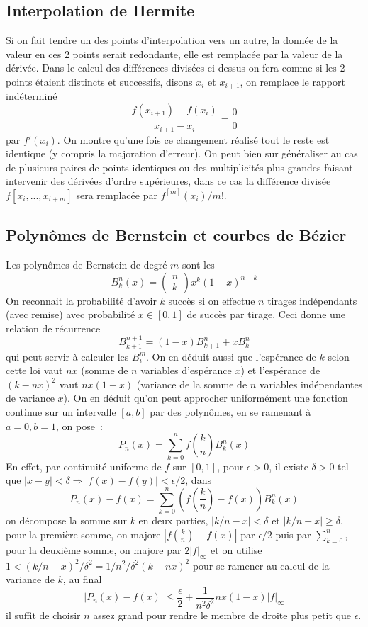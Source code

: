 \documentclass[a4paper,11pt]{article}
\begin{document}
\subsection{Interpolation de Hermite}
Si on fait tendre un des points d'interpolation vers un autre, la
donn\'ee de la valeur en ces 2 points serait redondante, elle 
est remplac\'ee par la valeur de la d\'eriv\'ee. Dans le calcul
des diff\'erences divis\'ees ci-dessus on fera comme si les
2 points \'etaient distincts et successifs, disons $x_i$ et $x_{i+1}$,
on remplace le rapport ind\'etermin\'e 
\[ \frac{f(x_{i+1})-f(x_i)}{x_{i+1}-x_i} = \frac00\]
par $f'(x_i)$.
On montre qu'une fois ce changement r\'ealis\'e
tout le reste est identique (y compris la majoration d'erreur).
On peut bien sur g\'en\'eraliser au cas de plusieurs paires de points 
identiques ou des multiplicit\'es plus grandes faisant intervenir
des d\'eriv\'ees d'ordre sup\'erieures, dans ce cas la diff\'erence
divis\'ee $f[x_i,...,x_{i+m}]$ sera remplac\'ee par $f^{[m]}(x_i)/m!$.

\subsection{Polyn\^omes de Bernstein et courbes de
  B\'ezier} 
Les polyn\^omes de Bernstein de degr\'e $m$ sont les
$$ B^n_k (x) = 
\left( \begin{array}{c} n \\ k \end{array} \right) x^k (1-x)^{n-k}$$
On reconnait la probabilit\'e d'avoir $k$ succ\`es si on effectue $n$
tirages ind\'ependants (avec remise) 
avec probabilit\'e $x \in [0,1]$ de succ\`es par tirage. Ceci donne
une relation de r\'ecurrence
$$ B^{n+1}_{k+1}=(1-x)B^n_{k+1}+x B^n_k $$
qui peut servir \`a calculer les $B^m_i$. On en d\'eduit aussi que l'esp\'erance
de $k$ selon cette loi vaut $nx$ (somme de $n$ variables d'esp\'erance
$x$) et l'esp\'erance de $(k-nx)^2$ vaut
$nx(1-x)$ (variance de la somme de $n$ variables ind\'ependantes
de variance $x$).
On en d\'eduit qu'on peut approcher uniform\'ement une
fonction continue sur un intervalle $[a,b]$ par des polyn\^omes, en
se ramenant \`a $a=0, b=1$, on pose~:
$$ P_n(x) = \sum_{k=0}^n f(\frac{k}{n}) B^n_k(x) $$
En effet, par continuit\'e uniforme de $f$ sur $[0,1]$, pour
$\epsilon>0$,
il existe $\delta>0$ tel que $|x-y|<\delta \Rightarrow
|f(x)-f(y)|<\epsilon/2$,
dans
$$P_n(x)-f(x)=\sum_{k=0}^n (f(\frac{k}{n})-f(x)) B^n_k(x)$$
on d\'ecompose la somme sur $k$ en deux parties, $|k/n-x|<\delta$
et $|k/n-x| \geq \delta$, pour la premi\`ere somme, on majore
$|f(\frac{k}{n})-f(x)|$ par $\epsilon/2$ puis par $\sum_{k=0}^n$,
pour la deuxi\`eme somme, on majore par $2|f|_\infty$ et on utilise
$1<(k/n-x)^2/\delta^2=1/n^2/\delta^2 (k-nx)^2$ pour se ramener au calcul
de la variance de $k$, au final
$$ |P_n(x)-f(x)| \leq \frac \epsilon 2 + \frac{1}{n^2 \delta^2} nx(1-x)|f|_\infty$$
il suffit de choisir $n$ assez grand pour rendre le membre de droite
plus petit que $\epsilon$.
\end{document}

